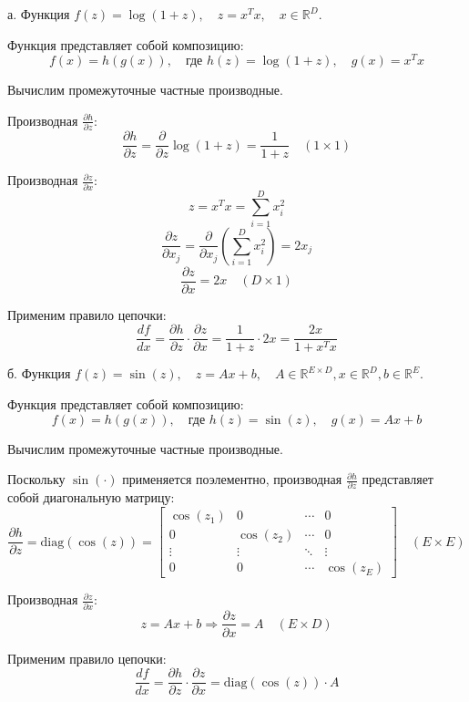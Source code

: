 \documentclass{article}
\begin{document}
а. Функция \( f(z) = \log(1 + z), \quad z = x^T x, \quad x \in \mathbb{R}^D \).

\quad

Функция представляет собой композицию:
\[
f(x) = h(g(x)), \quad \text{где } h(z) = \log(1 + z), \quad g(x) = x^T x
\]

Вычислим промежуточные частные производные.

\quad

Производная \( \frac{\partial h}{\partial z} \):
\[
\frac{\partial h}{\partial z} = \frac{\partial}{\partial z} \log(1 + z) = \frac{1}{1 + z} \quad (1 \times 1)
\]

Производная \( \frac{\partial z}{\partial x} \):
\[
z = x^T x = \sum_{i=1}^D x_i^2
\]
\[
\frac{\partial z}{\partial x_j} = \frac{\partial}{\partial x_j} \left( \sum_{i=1}^D x_i^2 \right) = 2x_j
\]
\[
\frac{\partial z}{\partial x} = 2x \quad (D \times 1)
\]

Применим правило цепочки:
\[
\frac{df}{dx} = \frac{\partial h}{\partial z} \cdot \frac{\partial z}{\partial x}
= \frac{1}{1 + z} \cdot 2x
= \frac{2x}{1 + x^T x}
\]

\quad

б. Функция \( f(z) = \sin(z), \quad z = Ax + b, \quad A \in \mathbb{R}^{E \times D}, x \in \mathbb{R}^D, b \in \mathbb{R}^E \).

\quad

Функция представляет собой композицию:
\[
f(x) = h(g(x)), \quad \text{где } h(z) = \sin(z), \quad g(x) = Ax + b
\]

Вычислим промежуточные частные производные.

\quad

Поскольку \(\sin(\cdot)\) применяется поэлементно, производная \( \frac{\partial h}{\partial z} \) представляет собой диагональную матрицу:
\[
\frac{\partial h}{\partial z} = \text{diag}(\cos(z)) = \begin{bmatrix}
\cos(z_1) & 0 & \cdots & 0 \\
0 & \cos(z_2) & \cdots & 0 \\
\vdots & \vdots & \ddots & \vdots \\
0 & 0 & \cdots & \cos(z_E)
\end{bmatrix} \quad (E \times E)
\]

Производная \( \frac{\partial z}{\partial x} \):
\[
z = Ax + b \Rightarrow \frac{\partial z}{\partial x} = A \quad (E \times D)
\]

Применим правило цепочки:
\[
\frac{df}{dx} = \frac{\partial h}{\partial z} \cdot \frac{\partial z}{\partial x}
= \text{diag}(\cos(z)) \cdot A
\]
\end{document}
